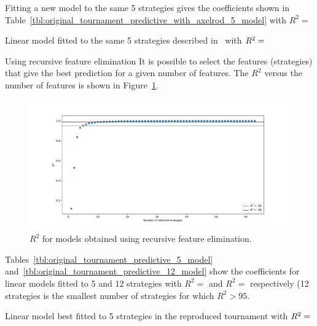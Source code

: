 \documentclass{article}
\begin{document}
Fitting a new model to the same 5 strategies gives the coefficients shown in
Table~\ref{tbl:original_tournament_predictive_with_axelrod_5_model} with
\(R^2=\)

\begin{table}[!hbtp]
        \centering
        
        \caption{Linear model fitted to the same 5 strategies described
                 in~\cite{Axelrod1980b} with
             \(R^2=\protect\)}
        \label{tbl:original_tournament_predictive_with_axelrod_5_model}
\end{table}

Using recursive feature elimination
It is possible to select the features (strategies) that give the best prediction
for a given number of features. The \(R^2\) versus the number of features is
shown in
Figure~\ref{fig:original_tournament_r_squared_versus_number_of_features}.

\begin{figure}[!hbtp]
    \centering
    \includegraphics[width=.8\textwidth]{assets/original_tournament_r_squared_versus_number_of_features.pdf}
    \caption{\(R^2\) for models obtained using recursive feature elimination.}
    \label{fig:original_tournament_r_squared_versus_number_of_features}
\end{figure}


Tables~\ref{tbl:original_tournament_predictive_5_model}
and~\ref{tbl:original_tournament_predictive_12_model} show the coefficients for
linear models fitted to 5 and 12 strategies with
\(R^2=\) and
\(R^2=\)
respectively (12 strategies is the smallest number of strategies for which
\(R^2>95\).


\begin{table}[!hbtp]
        \centering
        
        \caption{Linear model best fitted to 5 strategies in the reproduced tournament
                 with
             \(R^2=\protect\)}
        \label{tbl:original_tournament_predictive_5_model}
\end{table}
\end{document}
